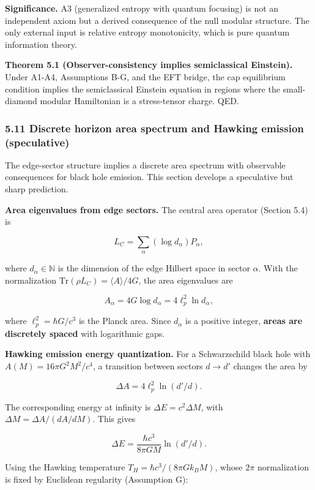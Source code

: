 \documentclass[
]{article}
\begin{document}
\textbf{Significance.} A3 (generalized entropy with quantum focusing) is
not an independent axiom but a derived consequence of the null modular
structure. The only external input is relative entropy monotonicity,
which is pure quantum information theory.

\textbf{Theorem 5.1 (Observer-consistency implies semiclassical
Einstein).} Under A1-A4, Assumptions B-G, and the EFT bridge, the cap
equilibrium condition implies the semiclassical Einstein equation in
regions where the small-diamond modular Hamiltonian is a stress-tensor
charge. QED.

\subsubsection{5.11 Discrete horizon area spectrum and Hawking emission
(speculative)}\label{discrete-horizon-area-spectrum-and-hawking-emission-speculative}

The edge-sector structure implies a discrete area spectrum with
observable consequences for black hole emission. This section develops a
speculative but sharp prediction.

\textbf{Area eigenvalues from edge sectors.} The central area operator
(Section 5.4) is

\[
L_C = \sum_\alpha (\log d_\alpha) P_\alpha,
\]

where \(d_\alpha \in \mathbb{N}\) is the dimension of the edge Hilbert
space in sector \(\alpha\). With the normalization
\(\mathrm{Tr}(\rho L_C) = \langle A
\rangle / 4G\), the area eigenvalues are

\[
A_\alpha = 4G \log d_\alpha = 4\ell_p^2 \ln d_\alpha,
\]

where \(\ell_p^2 = \hbar G/c^3\) is the Planck area. Since \(d_\alpha\)
is a positive integer, \textbf{areas are discretely spaced} with
logarithmic gaps.

\textbf{Hawking emission energy quantization.} For a Schwarzschild black
hole with \(A(M) = 16\pi G^2 M^2/c^4\), a transition between sectors
\(d \to d'\) changes the area by

\[
\Delta A = 4\ell_p^2 \ln(d'/d).
\]

The corresponding energy at infinity is \(\Delta E = c^2 \Delta M\),
with \(\Delta M = \Delta A / (dA/dM)\). This gives

\[
\Delta E = \frac{\hbar c^3}{8\pi G M} \ln(d'/d).
\]

Using the Hawking temperature \(T_H = \hbar c^3 / (8\pi G k_B M)\),
whose \(2\pi\) normalization is fixed by Euclidean regularity
(Assumption G):
\end{document}
